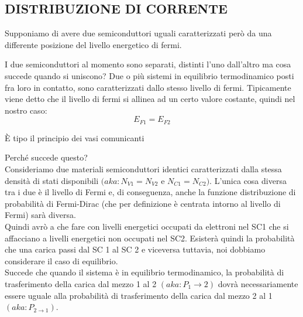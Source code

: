 \subsection*{DISTRIBUZIONE DI CORRENTE}
Supponiamo di avere due semiconduttori uguali caratterizzati però da una differente posizione del livello energetico di fermi. 
\begin{center}
\end{center}
I due semiconduttori al momento sono separati, distinti l'uno dall'altro ma cosa succede quando si uniscono?
Due o più sistemi in equilibrio termodinamico posti fra loro in contatto, sono caratterizzati dallo stesso livello di fermi. 
Tipicamente viene detto che il livello di fermi si allinea ad un certo valore costante, quindi nel nostro caso:
\begin{equation}
	E_{F1} = E_{F2}
\end{equation}

È tipo il principio dei vasi comunicanti
\newline

Perché succede questo?\\
Consideriamo due materiali semiconduttori identici caratterizzati dalla stessa densità di stati disponibili $(aka: N_{V1}=N_{V2}$ e $ N_{C1}=N_{C2})$.
L'unica cosa diversa tra i due è il livello di Fermi e, di conseguenza, anche la funzione distribuzione di probabilità di Fermi-Dirac (che per definizione è centrata intorno al livello di Fermi) sarà diversa.\\

Quindi avrò a che fare con livelli energetici occupati da elettroni nel SC1 che si affacciano a livelli energetici non occupati nel SC2.
Esisterà quindi la probabilità che una carica passi dal SC 1 al SC 2 e viceversa tuttavia, noi dobbiamo considerare il caso di equilibrio.\\
Succede che quando il sistema è in equilibrio termodinamico, la probabilità di trasferimento della carica dal mezzo 1 al 2 $(aka: P_1 \rightarrow 2)$ dovrà necessariamente essere uguale alla probabilità di trasferimento della carica dal mezzo 2 al 1 $(aka: P_{2 \rightarrow 1})$.

